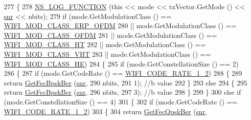 \begin{DoxyCode}
277 \{
278   \hyperlink{log-macros-disabled_8h_a90b90d5bad1f39cb1b64923ea94c0761}{NS\_LOG\_FUNCTION} (\textcolor{keyword}{this} << mode << txVector.GetMode () << \hyperlink{lte__amc_8m_a7543c5e4e80c828b652e0c63e4a6de70}{snr} << nbits);
279   \textcolor{keywordflow}{if} (mode.GetModulationClass () == \hyperlink{namespacens3_aa999e1221606a2b21b1eb33c2007c217afc1f5ef8d2c985f37a3224dd86ab014d}{WIFI\_MOD\_CLASS\_ERP\_OFDM}
280       || mode.GetModulationClass () == \hyperlink{namespacens3_aa999e1221606a2b21b1eb33c2007c217a30a83a0318357c9611f09e6faadc8006}{WIFI\_MOD\_CLASS\_OFDM}
281       || mode.GetModulationClass () == \hyperlink{namespacens3_aa999e1221606a2b21b1eb33c2007c217a6ac45cac36cc4454649435d24ebf349c}{WIFI\_MOD\_CLASS\_HT}
282       || mode.GetModulationClass () == \hyperlink{namespacens3_aa999e1221606a2b21b1eb33c2007c217a9863e4342bf5c238c74dddfc4d96c67e}{WIFI\_MOD\_CLASS\_VHT}
283       || mode.GetModulationClass () == \hyperlink{namespacens3_aa999e1221606a2b21b1eb33c2007c217abfa4f7272510045a9b43e8ac27ac13b0}{WIFI\_MOD\_CLASS\_HE})
284     \{
285       \textcolor{keywordflow}{if} (mode.GetConstellationSize () == 2)
286         \{
287           \textcolor{keywordflow}{if} (mode.GetCodeRate () == \hyperlink{namespacens3_aeaf3a86fd4bdb7829955238fba43e2ada66dfa017f6a74bcb72cdccfee778e90b}{WIFI\_CODE\_RATE\_1\_2})
288             \{
289               \textcolor{keywordflow}{return} \hyperlink{classns3_1_1NistErrorRateModel_a556148c8f5751a3784e8f5c8d76cedfc}{GetFecBpskBer} (\hyperlink{lte__amc_8m_a7543c5e4e80c828b652e0c63e4a6de70}{snr},
290                                     nbits,
291                                     1); \textcolor{comment}{//b value}
292             \}
293           \textcolor{keywordflow}{else}
294             \{
295               \textcolor{keywordflow}{return} \hyperlink{classns3_1_1NistErrorRateModel_a556148c8f5751a3784e8f5c8d76cedfc}{GetFecBpskBer} (\hyperlink{lte__amc_8m_a7543c5e4e80c828b652e0c63e4a6de70}{snr},
296                                     nbits,
297                                     3); \textcolor{comment}{//b value}
298             \}
299         \}
300       \textcolor{keywordflow}{else} \textcolor{keywordflow}{if} (mode.GetConstellationSize () == 4)
301         \{
302           \textcolor{keywordflow}{if} (mode.GetCodeRate () == \hyperlink{namespacens3_aeaf3a86fd4bdb7829955238fba43e2ada66dfa017f6a74bcb72cdccfee778e90b}{WIFI\_CODE\_RATE\_1\_2})
303             \{
304               \textcolor{keywordflow}{return} \hyperlink{classns3_1_1NistErrorRateModel_afbb3d9290227e060dffe73fb8bc959a9}{GetFecQpskBer} (\hyperlink{lte__amc_8m_a7543c5e4e80c828b652e0c63e4a6de70}{snr},

\end{DoxyCode}
